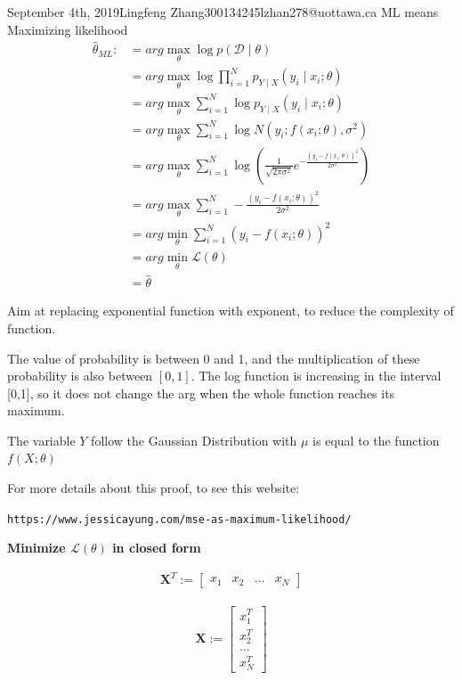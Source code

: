 \documentclass{article}
\begin{document}
\begin{lecture}{September 4th, 2019}{Lingfeng Zhang}{300134245}{lzhan278@uottawa.ca}
ML means Maximizing likelihood
\begin{align*}
\hat\theta_{ML} :&= arg\max\limits_{\theta}\log p(\mathcal{D}\mid\theta)\\&= arg\max\limits_{\theta}\log \prod_{i=1}^{N} p_{Y\mid X}(y_i\mid x_i;\theta)\\ &= arg\max\limits_{\theta} \sum_{i=1}^{N}\log p_{Y\mid X}(y_i\mid x_i;\theta)\\&= arg\max\limits_{\theta} \sum_{i=1}^{N}\log N(y_i;f(x_i;\theta ),\sigma ^2)\\&= arg\max\limits_{\theta} \sum_{i=1}^{N}\log (\frac{1}{\sqrt{2\pi \sigma ^2}} e ^{ -\frac{(y_i-f(x_i;\theta ))^2}{2\sigma ^2}} ) \\&= arg\max\limits_{\theta} \sum_{i=1}^{N} -\frac{(y_i-f(x_i;\theta ))^2}{2\sigma ^2} \\&= arg\min\limits_{\theta} \sum_{i=1}^{N} (y_i-f(x_i;\theta ))^2\\&= arg\min\limits_{\theta}\mathcal{L}(\theta)\\&=\hat{\theta}
\end{align*}


Aim at replacing exponential function with exponent, to reduce the complexity of function.

The value of probability is between 0 and 1, and the multiplication of these probability is also between $[0,1]$. The log function is increasing in the interval [0,1], so it does not change the arg when the whole function reaches its maximum. 


The variable $Y$ follow the Gaussian Distribution with $\mu$ is equal to the function $f(X;\theta)$ 

For more details about this proof, to see this website: 

\texttt{https://www.jessicayung.com/mse-as-maximum-likelihood/}

\textbf{Minimize $\mathcal{L}(\theta)$ in closed form}

\begin{eqnarray}
\textbf{X}^T := 
\left[ {\begin{array}{cccc}
   x_1 &
   x_2 &
   ... &
   x_N
  \end{array} } \right]
\end{eqnarray}
  
\begin{eqnarray}\textbf{X} := 
\left[ {\begin{array}{c}
   x_1^T \\
   x_2^T \\
   ... \\
   x_N^T
  \end{array} } \right]\end{eqnarray}
  

\end{lecture}
\end{document}
